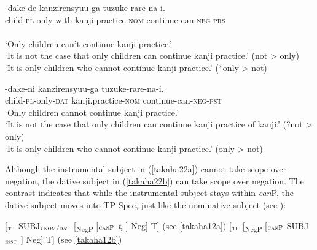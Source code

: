 \documentclass[output=paper]{langscibook}
\begin{document}
\begin{exe}
\ex \label{takaha22}
\begin{xlist}
\ex \label{takaha22a}
	-{dake-de} {kanzirensyuu-ga} {tuzuke-rare-na-i.}\\
	child-\textsc{pl}-only-with  kanji.practice-\textsc{nom} continue-can-\textsc{neg}-\textsc{prs}\\\\
	\glt `Only children can't continue kanji practice.’\\ 
	‘It is not the case that only children can continue kanji practice.’ (not \textgreater{} only)\\
	‘It is only children who cannot continue kanji practice.’ (*only \textgreater{} not)
    	
\ex \label{takaha22b}
	-{dake-ni} {kanzirensyuu-ga} {tuzuke-rare-na-i.}\\
	child-\textsc{pl}-only-\textsc{dat}       kanji.practice-\textsc{nom} continue-can-\textsc{neg}-\textsc{pst}\\
	\glt ‘Only children cannot continue kanji practice.’\\
	‘It is not the case that only children can continue kanji practice of kanji.’ (?not  \textgreater{} only)\\	           ‘It is only children who cannot continue kanji practice.’ (only \textgreater{} not)
\end{xlist}
\end{exe}

Although the instrumental subject in (\ref{takaha22a}) cannot take scope over negation, the dative subject in (\ref{takaha22b}) can take scope over negation. The contrast indicates that while the instrumental subject stays within \emph{can}P, the dative subject moves into TP Spec, just like the nominative subject (see \citealt{Ura1999, Kishimoto2010}):

\begin{exe}
\ex \label{takaha23}
\begin{xlist}
\ex \label{takaha23a}
	[$_{\textnormal{\textsc{tp}}}$ SUBJ$_{i\,\textnormal{\textsc{nom/dat}}}$ \hspace{1mm} [\textsubscript{NegP} [$_{\textnormal{\textsc{canP}}}$ \hspace{8mm} \emph{t$_{\text{i}}$} \hspace{8mm}] Neg] T] 
	\hfill (see \ref{takaha12a})
\ex \label{takaha23b}
	[$_{\textnormal{\textsc{tp}}}$ \hspace{23mm} [\textsubscript{NegP} [$_{\textnormal{\textsc{canP}}}$ \hspace{1mm} SUBJ$_{\textnormal{\textsc{inst}}}$ \hspace{3mm}] Neg] T] 
	\hfill (see \ref{takaha12b})
\end{xlist}
\end{exe}
\end{document}
